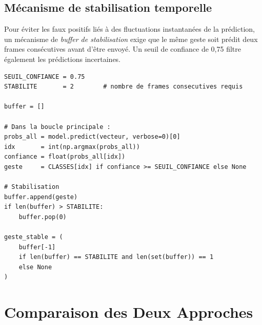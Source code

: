 \documentclass[12pt, a4paper]{article}
\begin{document}
\subsection{Mécanisme de stabilisation temporelle}

Pour éviter les faux positifs liés à des fluctuations instantanées de la
prédiction, un mécanisme de \emph{buffer de stabilisation} exige que le même
geste soit prédit deux frames consécutives avant d'être envoyé. Un seuil de
confiance de 0,75 filtre également les prédictions incertaines.

\begin{lstlisting}[caption={Stabilisation temporelle des prédictions (extrait de
                   \texttt{5\_jouer\_avec\_cnn.py})},
                   label=lst:stabilisation]
SEUIL_CONFIANCE = 0.75
STABILITE       = 2        # nombre de frames consecutives requis

buffer = []

# Dans la boucle principale :
probs_all = model.predict(vecteur, verbose=0)[0]
idx       = int(np.argmax(probs_all))
confiance = float(probs_all[idx])
geste     = CLASSES[idx] if confiance >= SEUIL_CONFIANCE else None

# Stabilisation
buffer.append(geste)
if len(buffer) > STABILITE:
    buffer.pop(0)

geste_stable = (
    buffer[-1]
    if len(buffer) == STABILITE and len(set(buffer)) == 1
    else None
)
\end{lstlisting}

\section{Comparaison des Deux Approches}
\label{sec:comparaison}
\end{document}

